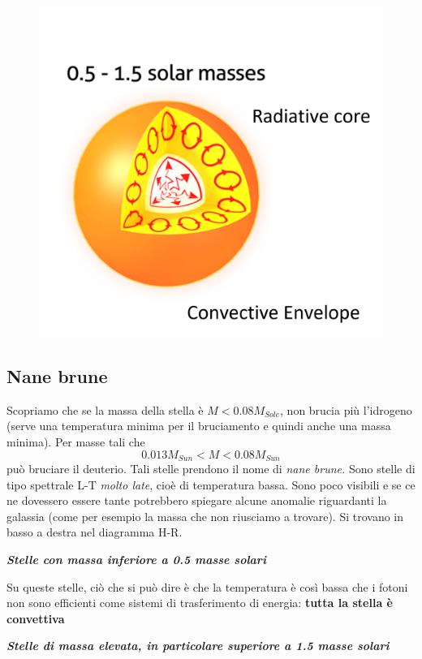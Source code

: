 \documentclass[a4paper,11pt]{article}
\begin{document}
\begin{figure}[H]
    \centering
    \includegraphics[scale=0.5]{solecore.png}
\end{figure}

\subsection{Nane brune}

Scopriamo che se la massa della stella è $M<0.08 M_{Sole}$, non brucia più l'idrogeno (serve una temperatura minima per il bruciamento e quindi anche una massa minima). Per masse tali che
$$0.013 M_{Sun}<M<0.08 M_{Sun}$$
può bruciare il deuterio. Tali stelle prendono il nome di \textit{nane brune.} Sono stelle di tipo spettrale L-T \textit{molto late}, cioè di temperatura bassa. Sono poco visibili e se ce ne dovessero essere tante potrebbero spiegare alcune anomalie riguardanti la galassia (come per esempio la massa che non riusciamo a trovare). Si trovano in basso a destra nel diagramma H-R.

\textbf{\textit{Stelle con massa inferiore a 0.5 masse solari}}

Su queste stelle, ciò che si può dire è che la temperatura è così bassa che i fotoni non sono efficienti come sistemi di trasferimento di energia: \textbf{tutta la stella è convettiva}

\textit{\textbf{Stelle di massa elevata, in particolare superiore a 1.5 masse solari}}
\end{document}

